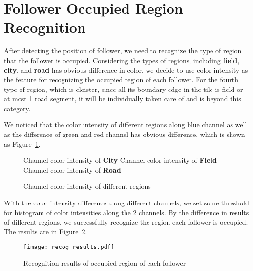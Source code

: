 \section{Follower Occupied Region Recognition}
After detecting the position of follower, we need to recognize the type of region that the follower is occupied. Considering the types of 
regions, including \textbf{field}, \textbf{city}, and \textbf{road} has obvious difference in color, we decide to use color intensity as the feature for 
recognizing the occupied region of each follower. For the fourth type of region, which is cloister, since all its boundary edge in the tile 
is field or at most 1 road segment, it will be individually taken care of and is beyond this category.

We noticed that the color intensity of different regions along blue channel as well as the difference of green and red channel has obvious 
difference, which is shown as Figure~\ref{Channel_diff}.

	\begin{figure}[htbp]
        \centering

        \caption{Channel color intensity of different regions}
         Channel color intensity of \textbf{City}
         Channel color intensity of \textbf{Field}
		 Channel color intensity of \textbf{Road}
        \label{Channel_diff}
     \end{figure}

With the color intensity difference along different channels, we set some threshold for histogram of color intensities along the 
2 channels. By the difference in results of different regions, we successfully recognize the region each follower is occupied. The 
results are in Figure~\ref{recog_results}.

	\begin{figure}[htbp]
		  \centering
		  \texttt{[image: recog\_results.pdf]}
		  \caption{Recognition results of occupied region of each follower}
		  \label{recog_results}
	\end{figure}

 